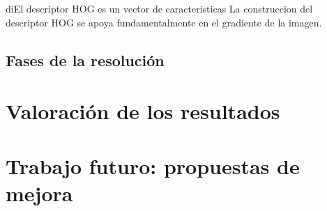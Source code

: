 \documentclass[a4paper,12pt]{article}
\begin{document}
diEl descriptor HOG es un vector de caracteristicas 
La construccion del descriptor HOG se apoya fundamentalmente en el gradiente de la imagen.

\subsection{Fases de la resolución}


\section{Valoración de los resultados}


\section{Trabajo futuro: propuestas de mejora}

\normalsize


%
%
\end{document}
